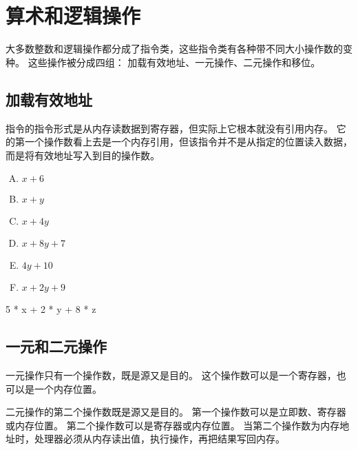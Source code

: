 
\section{算术和逻辑操作}
{
    大多数整数和逻辑操作都分成了指令类，这些指令类有各种带不同大小操作数的变种。
    这些操作被分成四组：
    加载有效地址、一元操作、二元操作和移位。

    \subsection{加载有效地址}
    {
        指令的指令形式是从内存读数据到寄存器，但实际上它根本就没有引用内存。
        它的第一个操作数看上去是一个内存引用，但该指令并不是从指定的位置读入数据，而是将有效地址写入到目的操作数。

        \begin{practicec}
            \begin{enumerate}[A.]
                \item $x + 6$
                \item $x + y$
                \item $x + 4y$
                \item $x + 8y + 7$
                \item $4y + 10$
                \item $x + 2y + 9$
            \end{enumerate}
        \end{practicec}

        \begin{practicec}
            5 * x + 2 * y + 8 * z
        \end{practicec}
    }

    \subsection{一元和二元操作}
    {
        一元操作只有一个操作数，既是源又是目的。
        这个操作数可以是一个寄存器，也可以是一个内存位置。

        二元操作的第二个操作数既是源又是目的。
        第一个操作数可以是立即数、寄存器或内存位置。
        第二个操作数可以是寄存器或内存位置。
        当第二个操作数为内存地址时，处理器必须从内存读出值，执行操作，再把结果写回内存。


    }
}
